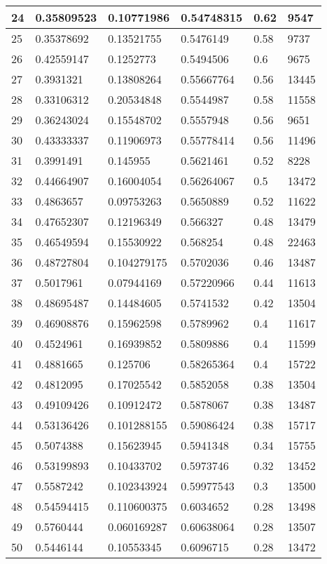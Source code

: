 \begin{longtable}{|l|l|l|l|l|l|}
24 & 0.35809523 & 0.10771986 & 0.54748315 & 0.62 & 9547 \\ \hline 
25 & 0.35378692 & 0.13521755 & 0.5476149 & 0.58 & 9737 \\ \hline 
26 & 0.42559147 & 0.1252773 & 0.5494506 & 0.6 & 9675 \\ \hline 
27 & 0.3931321 & 0.13808264 & 0.55667764 & 0.56 & 13445 \\ \hline 
28 & 0.33106312 & 0.20534848 & 0.5544987 & 0.58 & 11558 \\ \hline 
29 & 0.36243024 & 0.15548702 & 0.5557948 & 0.56 & 9651 \\ \hline 
30 & 0.43333337 & 0.11906973 & 0.55778414 & 0.56 & 11496 \\ \hline 
31 & 0.3991491 & 0.145955 & 0.5621461 & 0.52 & 8228 \\ \hline 
32 & 0.44664907 & 0.16004054 & 0.56264067 & 0.5 & 13472 \\ \hline 
33 & 0.4863657 & 0.09753263 & 0.5650889 & 0.52 & 11622 \\ \hline 
34 & 0.47652307 & 0.12196349 & 0.566327 & 0.48 & 13479 \\ \hline 
35 & 0.46549594 & 0.15530922 & 0.568254 & 0.48 & 22463 \\ \hline 
36 & 0.48727804 & 0.104279175 & 0.5702036 & 0.46 & 13487 \\ \hline 
37 & 0.5017961 & 0.07944169 & 0.57220966 & 0.44 & 11613 \\ \hline 
38 & 0.48695487 & 0.14484605 & 0.5741532 & 0.42 & 13504 \\ \hline 
39 & 0.46908876 & 0.15962598 & 0.5789962 & 0.4 & 11617 \\ \hline 
40 & 0.4524961 & 0.16939852 & 0.5809886 & 0.4 & 11599 \\ \hline 
41 & 0.4881665 & 0.125706 & 0.58265364 & 0.4 & 15722 \\ \hline 
42 & 0.4812095 & 0.17025542 & 0.5852058 & 0.38 & 13504 \\ \hline 
43 & 0.49109426 & 0.10912472 & 0.5878067 & 0.38 & 13487 \\ \hline 
44 & 0.53136426 & 0.101288155 & 0.59086424 & 0.38 & 15717 \\ \hline 
45 & 0.5074388 & 0.15623945 & 0.5941348 & 0.34 & 15755 \\ \hline 
46 & 0.53199893 & 0.10433702 & 0.5973746 & 0.32 & 13452 \\ \hline 
47 & 0.5587242 & 0.102343924 & 0.59977543 & 0.3 & 13500 \\ \hline 
48 & 0.54594415 & 0.110600375 & 0.6034652 & 0.28 & 13498 \\ \hline 
49 & 0.5760444 & 0.060169287 & 0.60638064 & 0.28 & 13507 \\ \hline 
50 & 0.5446144 & 0.10553345 & 0.6096715 & 0.28 & 13472 \\ \hline 
\end{longtable}